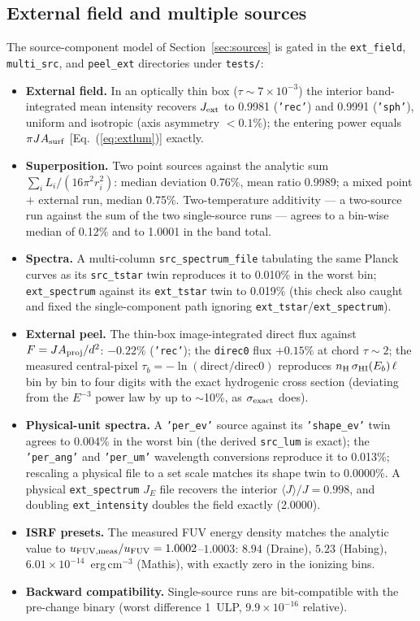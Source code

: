 \documentclass[english,a4paper]{my_memo}
\newcommand{\code}[1]{\texttt{#1}}
\begin{document}
\subsection{External field and multiple sources}
\label{sec:extval}
The source-component model of Section~\ref{sec:sources} is gated in the
\code{ext\_field}, \code{multi\_src}, and \code{peel\_ext} directories
under \code{tests/}:
\begin{itemize}\itemsep2pt
\item \textbf{External field.}  In an optically thin box
  ($\tau \sim 7{\times}10^{-3}$) the interior band-integrated mean
  intensity recovers $J_{\rm ext}$ to 0.9981 (\code{'rec'}) and 0.9991
  (\code{'sph'}), uniform and isotropic (axis asymmetry $< 0.1\%$); the
  entering power equals $\pi J A_{\rm surf}$ [Eq.~(\ref{eq:extlum})]
  exactly.
\item \textbf{Superposition.}  Two point sources against the analytic
  sum $\sum_i L_i/(16\pi^2 r_i^2)$: median deviation 0.76\%, mean ratio
  0.9989; a mixed point $+$ external run, median 0.75\%.
  Two-temperature additivity --- a two-source run against the sum of
  the two single-source runs --- agrees to a bin-wise median of 0.12\%
  and to 1.0001 in the band total.
\item \textbf{Spectra.}  A multi-column \code{src\_spectrum\_file}
  tabulating the same Planck curves as its \code{src\_tstar} twin
  reproduces it to 0.010\% in the worst bin; \code{ext\_spectrum}
  against its \code{ext\_tstar} twin to 0.019\% (this check also caught
  and fixed the single-component path ignoring
  \code{ext\_tstar}/\code{ext\_spectrum}).
\item \textbf{External peel.}  The thin-box image-integrated direct
  flux against $F = J A_{\rm proj}/d^2$: $-0.22\%$ (\code{'rec'}); the
  \code{direc0} flux $+0.15\%$ at chord $\tau \sim 2$; the measured
  central-pixel $\tau_b = -\ln(\mathrm{direct}/\mathrm{direc0})$
  reproduces $n_{\rm H}\,\sigma_{\rm HI}(E_b)\,\ell$ bin by bin to four
  digits with the exact hydrogenic cross section (deviating from the
  $E^{-3}$ power law by up to $\sim$10\%, as $\sigma_{\rm exact}$
  does).
\item \textbf{Physical-unit spectra.}  A \code{'per\_ev'} source against its
  \code{'shape\_ev'} twin agrees to 0.004\% in the worst bin (the derived
  \code{src\_lum} is exact); the \code{'per\_ang'} and \code{'per\_um'}
  wavelength conversions reproduce it to 0.013\%; rescaling a physical
  file to a set scale matches its shape twin to 0.0000\%.  A physical
  \code{ext\_spectrum} $J_E$ file recovers the interior
  $\langle J\rangle/J = 0.998$, and doubling \code{ext\_intensity}
  doubles the field exactly (2.0000).
\item \textbf{ISRF presets.}  The measured FUV energy density matches the
  analytic value to $u_{\rm FUV,meas}/u_{\rm FUV} = 1.0002$--$1.0003$:
  $8.94$ (Draine), $5.23$ (Habing), $6.01{\times}10^{-14}$~erg\,cm$^{-3}$
  (Mathis), with exactly zero in the ionizing bins.
\item \textbf{Backward compatibility.}  Single-source runs are
  bit-compatible with the pre-change binary (worst difference 1~ULP,
  $9.9{\times}10^{-16}$ relative).
\end{itemize}
\end{document}
